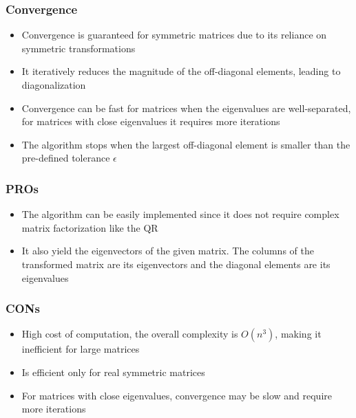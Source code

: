 \documentclass[journal]{IEEEtran}
\begin{document}
\subsubsection{Convergence}
\begin{itemize}
    \item Convergence is guaranteed for symmetric matrices due to its reliance on symmetric transformations 
    \item It iteratively reduces the magnitude of the off-diagonal elements, leading to diagonalization
    \item Convergence can be fast for matrices when the eigenvalues are well-separated, for matrices with close eigenvalues it requires more iterations
    \item The algorithm stops when the largest off-diagonal element is smaller than the pre-defined tolerance $\epsilon$\\
\end{itemize}
\subsubsection{PROs}
\begin{itemize}
    \item The algorithm can be easily implemented since it does not require complex matrix factorization like the QR
    \item It also yield the eigenvectors of the given matrix. The columns of the transformed matrix are its eigenvectors and the diagonal elements are its eigenvalues \\
\end{itemize}
\subsubsection{CONs}
\begin{itemize}
    \item High cost of computation, the overall complexity is $O(n^3)$, making it inefficient for large matrices 
    \item Is efficient only for real symmetric matrices 
    \item For matrices with close eigenvalues, convergence may be slow and require more iterations 
\end{itemize}
\end{document}
